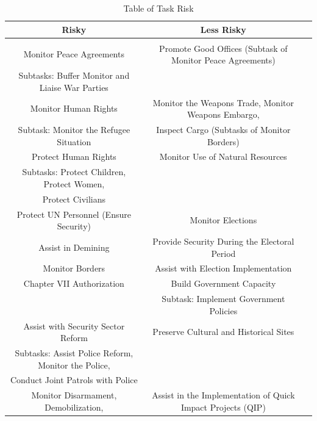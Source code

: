\documentclass{beamer}
\begin{document}
\begin{frame}[fragile]

\begin{table}[t]\centering
\def\sym#1{\ifmmode^{#1}\else\(^{#1}\)\fi}
\caption{Table of Task Risk}
\vspace{0.4cm}
\label{Table 1}
\fontsize{5.5}{5.5}\selectfont
\begin{tabular}{c*{2}{c}}
\hline\hline
                    \multicolumn{1}{c}{Risky}         &\multicolumn{1}{c}{Less Risky}      \\
\hline \\
Monitor Peace Agreements                                & Promote Good Offices (Subtask of Monitor Peace Agreements) \\
Subtasks: Buffer Monitor and Liaise War Parties         &  \\
[0.5em]
Monitor Human Rights                                    &   Monitor the Weapons Trade, Monitor Weapons Embargo, \\ 
Subtask: Monitor the Refugee Situation                  & Inspect Cargo (Subtasks of Monitor Borders) \\ 
[0.5em]
Protect Human Rights                                    & Monitor Use of Natural Resources \\
Subtasks: Protect Children, Protect Women,              &  \\
Protect Civilians                                       & \\
[0.5em]
Protect UN Personnel (Ensure Security)                  & Monitor Elections \\
[0.5em]
Assist in Demining                                     & Provide Security During the Electoral Period\\     
[0.5em]
Monitor Borders                                         & Assist with Election Implementation \\
[0.5em]
Chapter VII Authorization                               & Build Government Capacity \\
                                                        & Subtask: Implement Government Policies \\
[0.5em]
Assist with Security Sector Reform                      & Preserve Cultural and Historical Sites \\ 
Subtasks: Assist Police Reform, Monitor the Police,     &   \\
Conduct Joint Patrols with Police                        &   \\ 
[0.5em]
Monitor Disarmament, Demobilization,                    & Assist in the Implementation of Quick Impact Projects (QIP) \\

\end{tabular}
\end{table}
\end{frame}
\end{document}
